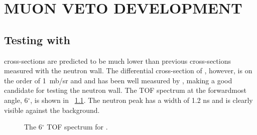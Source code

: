 %
%
%
%
%
%
%
%

%
%

\chapter{MUON VETO DEVELOPMENT}
\label{chap:muVeto}

\section{Testing with \MgReaction}

\GeTargets cross-sections are predicted to be much lower than previous cross-sections measured with the neutron wall.  The differential cross-section of \MgReaction, however, is on the order of 1~mb/sr and and has been well measured by \cite{Bohne_Mg}, making  a good candidate for testing the neutron wall.  The TOF spectrum at the forwardmost angle, 6$^{\circ}$, is shown in {\fig}~\ref{fig:MgTOF}.  The neutron peak has a width of 1.2 ns and is clearly visible against the background. 
\begin{figure}[htp]
\vspace{3in}
\caption{The 6$^{\circ}$ TOF spectrum for \MgReaction.}
\label{fig:MgTOF}
\end{figure}

